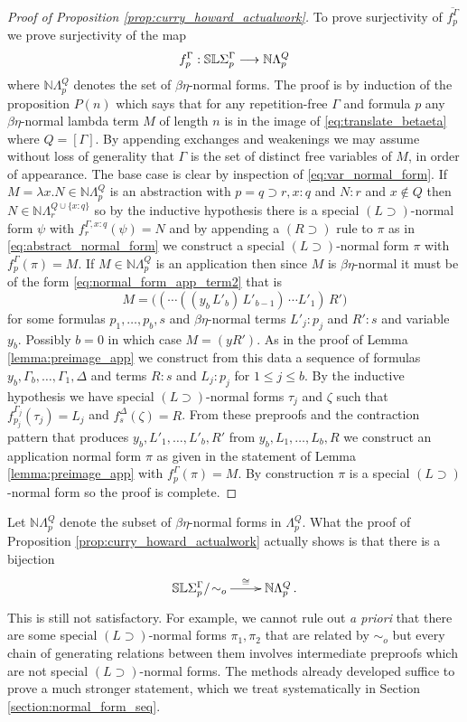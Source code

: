 \documentclass[english,letter paper,12pt,leqno]{article}
\theoremstyle{example}
\numberwithin{equation}{section}
\def\be{\begin{equation}}
\def\ee{\end{equation}}
\def\imp{\supset}
\begin{document}
\begin{proof}[Proof of Proposition \ref{prop:curry_howard_actualwork}]
To prove surjectivity of $\overline{f^\Gamma_p}$ we prove surjectivity of the map
\be\label{eq:translate_betaeta}
f^\Gamma_p: \mathbb{SL}\Sigma^\Gamma_p \lto \mathbb{N} \Lambda^Q_p
\ee
where $\mathbb{N} \Lambda^Q_p$ denotes the set of $\beta\eta$-normal forms. The proof is by induction of the proposition $P(n)$ which says that for any repetition-free $\Gamma$ and formula $p$ any $\beta\eta$-normal lambda term $M$ of length $n$ is in the image of \eqref{eq:translate_betaeta} where $Q = [\Gamma]$. By appending exchanges and weakenings we may assume without loss of generality that $\Gamma$ is the set of distinct free variables of $M$, in order of appearance. The base case is clear by inspection of \eqref{eq:var_normal_form}. If $M = \lambda x . N \in \mathbb{N}\Lambda^Q_p$ is an abstraction with $p = q \imp r, x:q$ and $N:r$ and $x \notin Q$ then $N \in \mathbb{N}\Lambda^{Q \cup \{x:q\}}_r$ so by the inductive hypothesis there is a special $(L \imp)$-normal form $\psi$ with $f^{\Gamma,x:q}_r(\psi) = N$ and by appending a $(R \imp)$ rule to $\pi$ as in \eqref{eq:abstract_normal_form} we construct a special $(L \imp)$-normal form $\pi$ with $f^\Gamma_p(\pi) = M$. If $M \in \mathbb{N} \Lambda^Q_p$ is an application then since $M$ is $\beta\eta$-normal it must be of the form \eqref{eq:normal_form_app_term2} that is
\be
M = \big( (\cdots( (y_b \, L'_b) \, L'_{b-1} ) \, \cdots L'_1) \, R'\big)
\ee
for some formulas $p_1,\ldots,p_b,s$ and $\beta\eta$-normal terms $L'_j:p_j$ and $R':s$ and variable $y_b$. Possibly $b = 0$ in which case $M = (y R')$. As in the proof of Lemma \ref{lemma:preimage_app} we construct from this data a sequence of formulas $y_b,\Gamma_b,\ldots,\Gamma_1,\Delta$ and terms $R:s$ and $L_j:p_j$ for $1 \le j \le b$. By the inductive hypothesis we have special $(L \imp)$-normal forms $\tau_j$ and $\zeta$ such that $f^{\Gamma_j}_{p_j}(\tau_j) = L_j$ and $f^{\Delta}_s(\zeta) = R$. From these preproofs and the contraction pattern that produces $y_b,L'_1,\ldots,L'_b,R'$ from $y_b,L_1,\ldots,L_b,R$ we construct an application normal form $\pi$ as given in the statement of Lemma \ref{lemma:preimage_app} with $f^\Gamma_p(\pi) = M$. By construction $\pi$ is a special $(L \imp)$-normal form so the proof is complete.
\end{proof}

Let $\mathbb{N} \Lambda^Q_p$ denote the subset of $\beta\eta$-normal forms in $\Lambda^Q_p$. What the proof of Proposition \ref{prop:curry_howard_actualwork} actually shows is that there is a bijection
\be
\xymatrix{
\mathbb{SL}\Sigma^\Gamma_p / \!\sim_o \ar[r]^-{\cong} & \mathbb{N} \Lambda^Q_p\,.
}
\ee
This is still not satisfactory. For example, we cannot rule out \emph{a priori} that there are some special $(L \imp)$-normal forms $\pi_1,\pi_2$ that are related by $\sim_o$ but every chain of generating relations between them involves intermediate preproofs which are not special $(L \imp)$-normal forms. The methods already developed suffice to prove a much stronger statement, which we treat systematically in Section \ref{section:normal_form_seq}.
\end{document}

